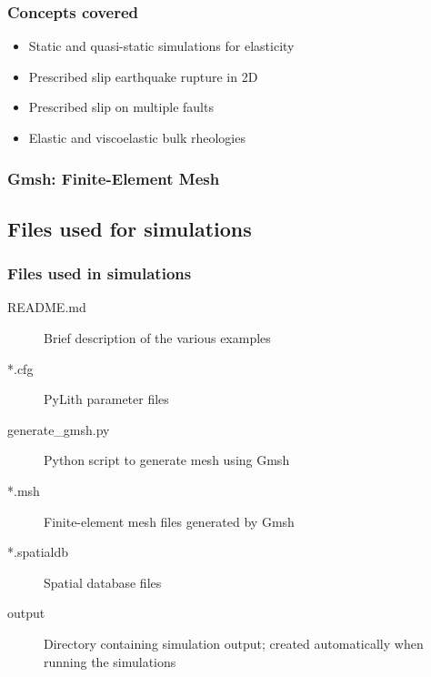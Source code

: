 \documentclass[aspectratio=169]{beamer}
\begin{document}
\begin{frame}
  \frametitle{Concepts covered}
  \summary{}

  \begin{itemize}
  \item Static and quasi-static simulations for elasticity
  \item Prescribed slip earthquake rupture in 2D
  \item Prescribed slip on multiple faults
  \item Elastic and viscoelastic bulk rheologies
  \end{itemize}
  
\end{frame}

\begin{frame}
  \frametitle{Gmsh: Finite-Element Mesh}

  
\end{frame}


\subsection{Files used for simulations}

\begin{frame}
  \frametitle{Files used in simulations}

  \begin{description}
  \item[README.md] Brief description of the various examples
  \item[*.cfg] PyLith parameter files
  \item[generate\_gmsh.py] Python script to generate mesh using Gmsh
  \item[*.msh] Finite-element mesh files generated by Gmsh
  \item[*.spatialdb] Spatial database files
  \item[output] Directory containing simulation output; created automatically when running the simulations
  \end{description}

\end{frame}
\end{document}

